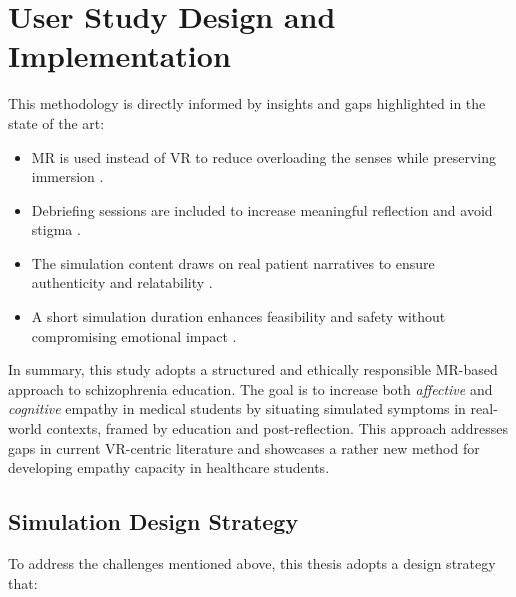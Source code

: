 \section{User Study Design and Implementation}

This methodology is directly informed by insights and gaps highlighted in the state of the art:

\begin{itemize}
    \item MR is used instead of VR to reduce overloading the senses while preserving immersion \cite{Krogmeier2024}.
    \item Debriefing sessions are included to increase meaningful reflection and avoid stigma \cite{Rueda2020, Ando2011}.
    \item The simulation content draws on real patient narratives to ensure authenticity and relatability \cite{Zare-Bidaki2022}.
    \item A short simulation duration enhances feasibility and safety without compromising emotional impact \cite{Formosa2018}.
\end{itemize}

In summary, this study adopts a structured and ethically responsible MR-based approach to schizophrenia education. The goal is to increase both \textit{affective} and \textit{cognitive} empathy in medical students by situating simulated symptoms in real-world contexts, framed by education and post-reflection. This approach addresses gaps in current VR-centric literature and showcases a rather new method for developing empathy capacity in healthcare students.


\subsection{Simulation Design Strategy}
To address the challenges mentioned above, this thesis adopts a design strategy that:

